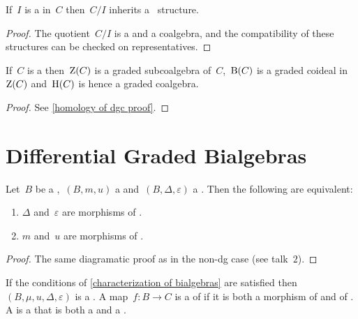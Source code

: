 \documentclass[a4paper,10pt,headings=standardclasses]{scrartcl}
\begin{document}
\begin{lemma}
  \label{quotient of dgc}
  If~$I$ is a {\dgci} in~$C$ then~$C/I$ inherits a~{\dgc} structure.
\end{lemma}

\begin{proof}
  The quotient~$C/I$ is a {\dgv} and a coalgebra, and the compatibility of these structures can be checked on representatives.
\end{proof}

\begin{proposition}
  \label{homology of dgc}
  If~$C$ is a {\dgc} then~$\operatorname{Z}(C)$ is a graded subcoalgebra of~$C$,~$\operatorname{B}(C)$ is a graded coideal in~$\operatorname{Z}(C)$ and~$\operatorname{H}(C)$ is hence a graded coalgebra.
\end{proposition}

\begin{proof}
  See \cref{homology of dgc proof}.
\end{proof}






\section{Differential Graded Bialgebras}

\begin{lemma}
  \label{characterization of bialgebras}
  Let~$B$ be a {\dgv},~$(B, m, u)$ a {\dga} and~$(B, \Delta, \varepsilon)$ a {\dgc}.
  Then the following are equivalent:
  \begin{enumerate}
    \item
      $\Delta$ and~$\varepsilon$ are morphisms of {\dgas}.
    \item
      $m$ and~$u$ are morphisms of {\dgcs}.
  \end{enumerate}
\end{lemma}

\begin{proof}
  The same diagramatic proof as in the non-dg case (see talk~$2$).
\end{proof}

\begin{definition}
  If the conditions of \cref{characterization of bialgebras} are satisfied then~$(B, \mu, u, \Delta, \varepsilon)$ is a {\dgb}.
  A map~$f \colon B \to C$ is a  of {\dgbs} if it is both a morphism of {\dgas} and of {\dgcs}.
  A  is a {\dgsub} that is both a {\dgi} and a {\dgci}.
\end{definition}
\end{document}
